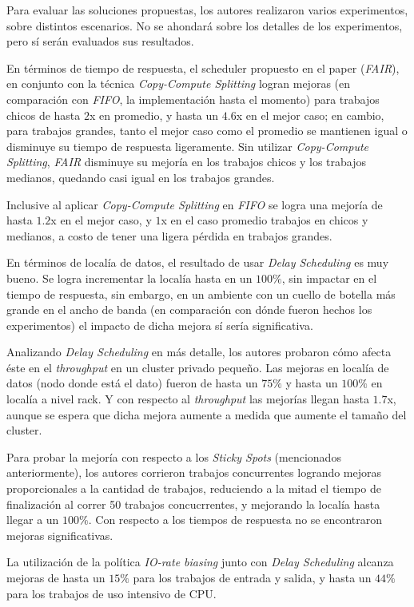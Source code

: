 \documentclass[a4paper]{article}
\begin{document}
Para evaluar las soluciones propuestas, los autores realizaron varios
experimentos, sobre distintos escenarios. No se ahondará sobre los detalles de
los experimentos, pero sí serán evaluados sus resultados.

En términos de tiempo de respuesta, el scheduler propuesto en el paper
(\textit{FAIR}), en conjunto con la técnica \textit{Copy-Compute Splitting} 
logran mejoras (en comparación con \textit{FIFO}, la implementación hasta el
momento) para trabajos chicos de hasta $2$x en 
promedio, y hasta un $4.6$x en el mejor caso; en cambio, para trabajos grandes,
tanto el mejor caso como el promedio se mantienen igual o disminuye su
tiempo de respuesta ligeramente. Sin utilizar \textit{Copy-Compute Splitting},
\textit{FAIR}  disminuye su mejoría en los trabajos chicos y los trabajos 
medianos, quedando casi igual en los trabajos grandes.

Inclusive al aplicar \textit{Copy-Compute Splitting} en \textit{FIFO} se logra
una mejoría de hasta $1.2$x en el mejor caso, y $1$x en el caso promedio
trabajos en chicos y medianos, a costo de tener una ligera pérdida en trabajos
grandes.

En términos de localía de datos, el resultado de usar \textit{Delay Scheduling}
es muy bueno. Se logra incrementar la localía hasta en un $100\%$, sin impactar
en el tiempo de respuesta, sin embargo, en un ambiente con un cuello de botella
más grande en el ancho de banda (en comparación con dónde fueron hechos los
experimentos) el impacto de dicha mejora sí sería significativa.

Analizando \textit{Delay Scheduling} en más detalle, los autores probaron cómo
afecta éste en el \textit{throughput} en un cluster privado pequeño. Las
mejoras en localía de datos (nodo donde está el dato) fueron de hasta un $75\%$
y hasta un $100\%$ en localía a nivel rack. Y con respecto al
\textit{throughput} las mejorías llegan hasta $1.7$x, aunque se espera que
dicha mejora aumente a medida que aumente el tamaño del cluster.

Para probar la mejoría con respecto a los \textit{Sticky Spots} (mencionados
anteriormente), los autores corrieron trabajos concurrentes logrando mejoras
proporcionales a la cantidad de trabajos, reduciendo a la mitad el tiempo de
finalización al correr 50 trabajos concucrrentes, y mejorando la localía hasta
llegar a un $100\%$. Con respecto a los tiempos de respuesta no se encontraron
mejoras significativas.

La utilización de la política \textit{IO-rate biasing} junto con \textit{Delay
Scheduling} alcanza mejoras de hasta un $15\%$ para los trabajos de entrada
y salida, y hasta un $44\%$ para los trabajos de uso intensivo de CPU.
\end{document}
